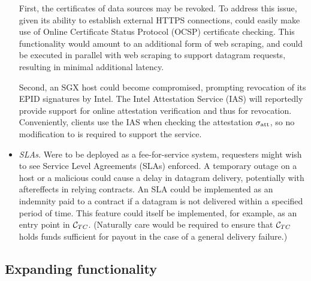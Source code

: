 \begin{itemize}
First, the certificates of data sources may be revoked. To address this issue, given its ability to establish external HTTPS connections, \tc could easily make use of Online Certificate Status Protocol (OCSP) certificate checking. This functionality would amount to an additional form of web scraping, and could be executed in parallel with web scraping to support datagram requests, resulting in minimal additional latency.

Second, an SGX host could become compromised, prompting revocation of its EPID signatures by Intel. The Intel Attestation Service (IAS) will reportedly provide support for online attestation verification and thus for revocation. Conveniently, clients use the IAS when checking the attestation ${\sigma_{\textrm{att}}}$, so no modification to \tc is required to support the service.


\item{\em SLAs.} Were \tc to be deployed as a fee-for-service system, requesters might wish to see Service Level Agreements (SLAs) enforced. A temporary outage on a \tc host or a malicious \medname could cause a delay in datagram delivery, potentially with aftereffects in relying contracts. An SLA could be implemented as an indemnity paid to a contract if a datagram is not delivered within a specified period of time. This feature could itself be implemented, for example, as an entry point in ${\cal C}_{TC}$. (Naturally care would be required to ensure that ${\cal C}_{TC}$ holds funds sufficient for payout in the case of a general delivery failure.)
\end{itemize}

\subsection{Expanding \tc functionality}

